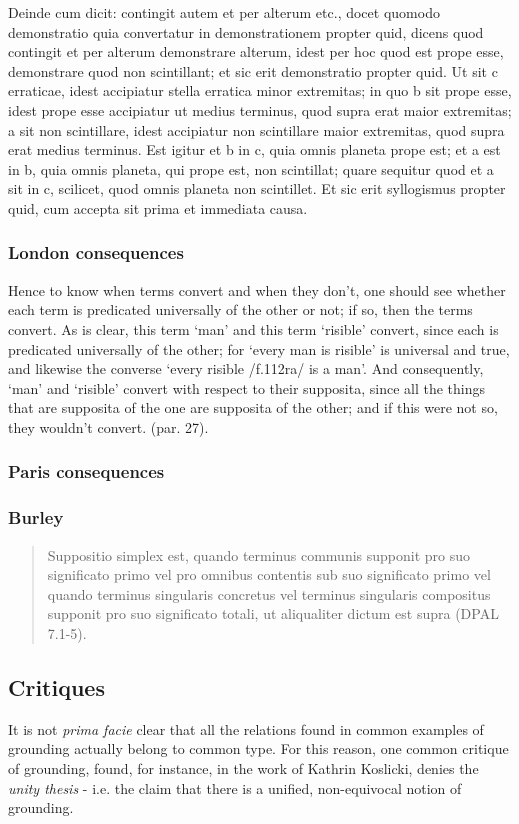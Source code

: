 Deinde cum dicit: contingit autem et per alterum etc., docet quomodo demonstratio quia convertatur in demonstrationem propter quid, dicens quod contingit et per alterum demonstrare alterum, idest per hoc quod est prope esse, demonstrare quod non scintillant; et sic erit demonstratio propter quid. Ut sit c erraticae, idest accipiatur stella erratica minor extremitas; in quo b sit prope esse, idest prope esse accipiatur ut medius terminus, quod supra erat maior extremitas; a sit non scintillare, idest accipiatur non scintillare maior extremitas, quod supra erat medius terminus. Est igitur et b in c, quia omnis planeta prope est; et a est in b, quia omnis planeta, qui prope est, non scintillat; quare sequitur quod et a sit in c, scilicet, quod omnis planeta non scintillet. Et sic erit syllogismus propter quid, cum accepta sit prima et immediata causa.
\subsubsection{London consequences}
Hence to know when terms convert and when they don't, one should see whether each term is predicated universally of the other or not; if so, then the terms convert. As is clear, this term `man' and this term `risible' convert, since each is predicated universally of the other; for `every man is risible' is universal and true, and likewise the converse `every risible /f.112ra/ is a man'. And consequently, `man' and `risible' convert with respect to their supposita, since all the things that are supposita of the one are supposita of the other; and if this were not so, they wouldn't convert. (par. 27).
\subsubsection{Paris consequences}
\subsubsection{Burley}
\begin{quote}
  Suppositio simplex est, quando terminus communis supponit pro suo significato primo vel pro omnibus contentis sub suo significato primo vel quando terminus singularis concretus vel terminus singularis compositus supponit pro suo significato totali, ut aliqualiter dictum est supra (DPAL 7.1-5).
\end{quote}

\subsection{Critiques}
It is not \textit{prima facie} clear that all the relations found in common examples of grounding  actually belong to common type. For this reason, one common critique of grounding, found, for instance, in the work of Kathrin Koslicki, denies the \textit{unity thesis} - i.e. the claim that there is a unified, non-equivocal notion of grounding.



